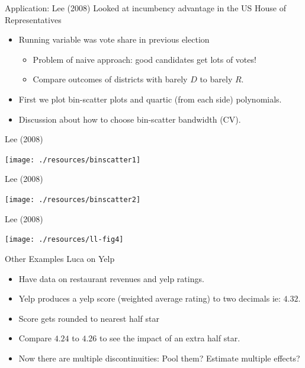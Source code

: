 \begin{frame}{Application: Lee (2008)}
Looked at incumbency advantage in the US House of Representatives
\begin{itemize}
\item Running variable was vote share in previous election
\begin{itemize}
\item Problem of naive approach: good candidates get lots of votes!
\item Compare outcomes of districts with barely $D$ to barely $R$.
\end{itemize}
\item First we plot bin-scatter plots and quartic (from each side) polynomials.
\item Discussion about how to choose bin-scatter bandwidth (CV).
\end{itemize}
\end{frame}

\begin{frame}{Lee (2008)}
\begin{center}
\texttt{[image: ./resources/binscatter1]}
\end{center}
\end{frame}

\begin{frame}{Lee (2008)}
\begin{center}
\texttt{[image: ./resources/binscatter2]}
\end{center}
\end{frame}

\begin{frame}{Lee (2008)}
\begin{center}
\texttt{[image: ./resources/ll-fig4]}
\end{center}
\end{frame}

\begin{frame}{Other Examples}
Luca on Yelp
\begin{itemize}
\item Have data on restaurant revenues and yelp ratings.
\item Yelp produces a yelp score (weighted average rating) to two decimals ie: $4.32$.
\item Score gets rounded to nearest half star
\item Compare $4.24$ to $4.26$ to see the impact of an extra half star.
\item Now there are multiple discontinuities: Pool  them? Estimate multiple effects?
\end{itemize}
\end{frame}


